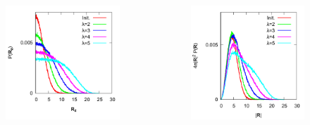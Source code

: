 \documentclass[11pt, dvipdfmx]{beamer}
\begin{document}
\begin{frame}
\begin{columns}[totalwidth=\linewidth]
\begin{figure}
\includegraphics[width=\columnwidth]{./fig/E2E_z.pdf}
\end{figure}
\vspace{-12mm}
\begin{figure}
\includegraphics[width=\columnwidth]{./fig/E2E_3d.pdf}
\end{figure}
\end{columns}
\end{frame}
\end{document}
